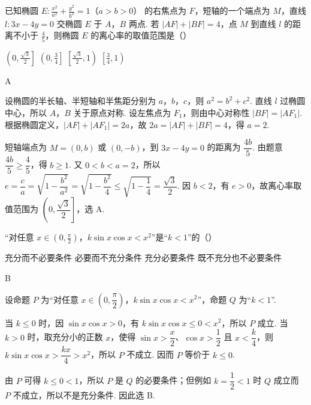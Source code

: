 \begin{problem}
已知椭圆 \(E: \frac{x^2}{a^2} + \frac{y^2}{b^2} = 1\)（\(a > b > 0\)） 的右焦点为 \(F\)，短轴的一个端点为 \(M\)，直线 \(l: 3x - 4y = 0\) 交椭圆 \(E\) 于 \(A\)，\(B\) 两点. 若 \(|AF| + |BF| = 4\)，点 \(M\) 到直线 \(l\) 的距离不小于 \(\frac{4}{5}\)，则椭圆 \(E\) 的离心率的取值范围是（\quad）

\choices
    {\(\left(0, \frac{\sqrt{3}}{2}\right]\)}
    {\(\left(0, \frac{3}{4}\right]\)}
    {\(\left[\frac{\sqrt{3}}{2}, 1\right)\)}
    {\(\left[\frac{3}{4}, 1\right)\)}
\end{problem}

\begin{answer}
A
\end{answer}

\begin{solution}
设椭圆的半长轴、半短轴和半焦距分别为 \(a\)，\(b\)，\(c\)，则 \(a^2=b^2+c^2\). 直线 \(l\) 过椭圆中心，所以 \(A\)，\(B\) 关于原点对称. 设左焦点为 \(F_1\)，则由中心对称性 \(|BF|=|AF_1|\). 根据椭圆定义，\(|AF|+|AF_1|=2a\)，故 \(2a=|AF|+|BF|=4\)，得 \(a=2\).

短轴端点为 \(M=(0,b)\) 或 \((0,-b)\)，到 \(3x-4y=0\) 的距离为 \(\dfrac{4b}{5}\). 由题意 \(\dfrac{4b}{5}\geqslant\dfrac45\)，得 \(b\geqslant1\). 又 \(0<b<a=2\)，所以
\(e=\dfrac ca=\sqrt{1-\dfrac{b^2}{a^2}}=\sqrt{1-\dfrac{b^2}{4}}\leqslant\sqrt{1-\dfrac14}=\dfrac{\sqrt3}{2}\).
因 \(b<2\)，有 \(e>0\)，故离心率取值范围为 \(\left(0,\dfrac{\sqrt3}{2}\right]\)，选 A.
\end{solution}

\begin{problem}
“对任意 \(x \in \left(0, \frac{\pi}{2}\right)\)，\(k \sin x \cos x < x^2\)”是“\(k < 1\)”的（\quad）

\choices
    {充分而不必要条件}
    {必要而不充分条件}
    {充分必要条件}
    {既不充分也不必要条件}
\end{problem}

\begin{answer}
B
\end{answer}

\begin{solution}
设命题 \(P\) 为“对任意 \(x\in\left(0,\dfrac\pi2\right)\)，\(k\sin x\cos x<x^2\)”，命题 \(Q\) 为“\(k<1\)”.

当 \(k\leqslant0\) 时，因 \(\sin x\cos x>0\)，有 \(k\sin x\cos x\leqslant0<x^2\)，所以 \(P\) 成立. 当 \(k>0\) 时，取充分小的正数 \(x\)，使得 \(\sin x>\dfrac{x}{2}\)、\(\cos x>\dfrac12\) 且 \(x<\dfrac{k}{4}\)，则 \(k\sin x\cos x>\dfrac{kx}{4}>x^2\)，所以 \(P\) 不成立. 因而 \(P\) 等价于 \(k\leqslant0\).

由 \(P\) 可得 \(k\leqslant0<1\)，所以 \(P\) 是 \(Q\) 的必要条件；但例如 \(k=\dfrac12<1\) 时 \(Q\) 成立而 \(P\) 不成立，所以不是充分条件. 因此选 B.
\end{solution}

